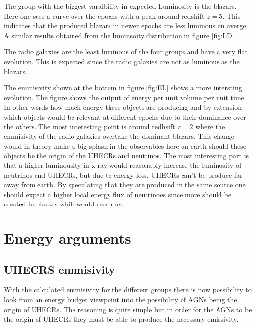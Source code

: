 \documentclass{article}
\begin{document}
The group with the biggest varaibility in expected Luminosity is the blazars. Here one sees a curve over the epochs with a peak around redshift $z=5$. 
This indicates that the produced blazars in newer epochs are less luminous on averge. A similar results obtained from the luminsoity distribution in figure \ref{fig:LD}.

The radio galaxies are the least luminous of the four groups and have a very flat evolution. This is expected since the radio galaxies are not as luminous as the blazars.

The emmisivity shown at the bottom in figure \ref{fig:EL} shows a more intersting evolution. The figure shows the output of energy per unit volume per unit time. In other words 
how much energy these objects are producing and by extension which objects would be relevant at different epochs due to their dominance over the others.
The most interesting point is around redhsift $z=2$ where the emmisivity of the radio galaxies overtake the dominant blazars. This change would in theory make
a big splash in the observables here on earth should these objects be the origin of the UHECRs and neutrinos. The most interesting part is that a higher luminousity in x-ray would 
reasonably increase the luminosity of neutrinos and UHECRs, but due to energy loss, UHECRs can't be produce far away from earth. By speculating that they are produced in the same source one should expect a 
higher local energy flux of neutrinoes since more should be created in blazars whih would reach us. 


\section{Energy arguments}
\subsection{UHECRS emmisivity}
With the calculated emmisivity for the different groups there is now possibility to look from an energy budget viewpoint into the possibility of AGNs being the origin of UHECRs. The 
reasoning is quite simple but in order for the AGNs to be the origin of UHECRs they must be able to produce the necessary emissivity. 
\end{document}

